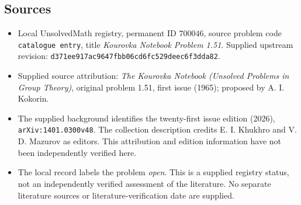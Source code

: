 \documentclass[11pt]{article}
\begin{document}
\subsection{Sources}
\begin{itemize}
\item Local UnsolvedMath registry, permanent ID \(700046\), source problem code \texttt{catalogue entry}, title \emph{Kourovka Notebook Problem 1.51}. Supplied upstream revision: \texttt{d371ee917ac9647fbb06cd6fc529deec6f3dda82}.
\item Supplied source attribution: \emph{The Kourovka Notebook (Unsolved Problems in Group Theory)}, original problem 1.51, first issue (1965); proposed by A. I. Kokorin.
\item The supplied background identifies the twenty-first issue edition (2026), \texttt{arXiv:1401.0300v48}. The collection description credits E. I. Khukhro and V. D. Mazurov as editors. This attribution and edition information have not been independently verified here.
\item The local record labels the problem \emph{open}. This is a supplied registry status, not an independently verified assessment of the literature. No separate literature sources or literature-verification date are supplied.
\end{itemize}
\end{document}
